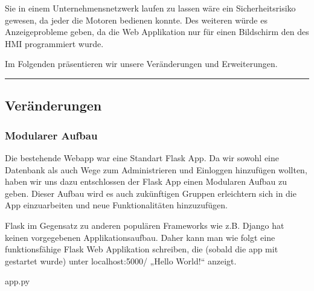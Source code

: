 \documentclass[letterpaper,10pt,ngerman]{sphinxmanual}
\begin{document}
Sie in einem Unternehmensnetzwerk laufen zu lassen wäre ein Sicherheitsrisiko gewesen, da jeder die Motoren bedienen konnte. Des weiteren würde es Anzeigeprobleme geben, da die Web Applikation nur für einen Bildschirm \sphinxhyphen{} den des HMI \sphinxhyphen{} programmiert wurde.

Im Folgenden präsentieren wir unsere Veränderungen und Erweiterungen.


\bigskip\hrule\bigskip



\subsection{Veränderungen}
\label{\detokenize{webapp:veranderungen}}

\subsubsection{Modularer Aufbau}
\label{\detokenize{webapp:modularer-aufbau}}
Die bestehende Webapp war eine Standart Flask App. Da wir sowohl eine Datenbank als auch Wege zum Administrieren und Einloggen hinzufügen wollten, haben wir uns dazu entschlossen der Flask App einen Modularen Aufbau zu geben. Dieser Aufbau wird es auch zukünftigen Gruppen erleichtern sich in die App einzuarbeiten und neue Funktionalitäten hinzuzufügen.

Flask \sphinxhyphen{} im Gegensatz zu anderen populären Frameworks wie z.B. Django hat keinen vorgegebenen Applikationsaufbau. Daher kann man wie folgt eine funktionsfähige Flask Web Applikation schreiben, die (sobald die app mit  gestartet wurde) unter localhost:5000/ „Hello World!“ anzeigt.

app.py

\begin{sphinxVerbatim}[commandchars=\\\{\}]
   
  

 
     

   
\end{sphinxVerbatim}
\end{document}
